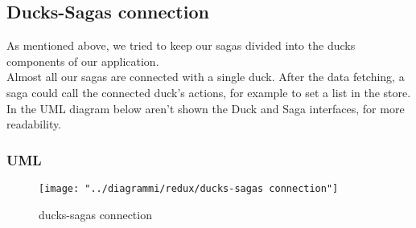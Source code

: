 
	\subsection{Ducks-Sagas connection}
	As mentioned above, we tried to keep our sagas divided into the ducks components of our application.\\
	Almost all our sagas are connected with a single duck. After the data fetching, a saga could call the connected duck's actions, for example to set a list in the store.
	In the UML diagram below aren't shown the Duck and Saga interfaces, for more readability.
	\subsubsection{UML}
	\begin{figure}[H]
		\centering
		\texttt{[image: "../diagrammi/redux/ducks-sagas connection"]}
		\caption{ducks-sagas connection}
		\label{fig:Ducks-sagas connection}
	\end{figure}
